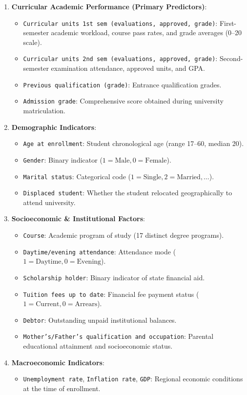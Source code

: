 \documentclass[11pt,a4paper]{article}
\begin{document}
\begin{enumerate}
    \item \textbf{Curricular Academic Performance (Primary Predictors)}:
    \begin{itemize}
        \item \texttt{Curricular units 1st sem (evaluations, approved, grade)}: First-semester academic workload, course pass rates, and grade averages (0--20 scale).
        \item \texttt{Curricular units 2nd sem (evaluations, approved, grade)}: Second-semester examination attendance, approved units, and GPA.
        \item \texttt{Previous qualification (grade)}: Entrance qualification grades.
        \item \texttt{Admission grade}: Comprehensive score obtained during university matriculation.
    \end{itemize}
    \item \textbf{Demographic Indicators}:
    \begin{itemize}
        \item \texttt{Age at enrollment}: Student chronological age (range 17--60, median 20).
        \item \texttt{Gender}: Binary indicator ($1=\text{Male}, 0=\text{Female}$).
        \item \texttt{Marital status}: Categorical code ($1=\text{Single}, 2=\text{Married}, \dots$).
        \item \texttt{Displaced student}: Whether the student relocated geographically to attend university.
    \end{itemize}
    \item \textbf{Socioeconomic \& Institutional Factors}:
    \begin{itemize}
        \item \texttt{Course}: Academic program of study (17 distinct degree programs).
        \item \texttt{Daytime/evening attendance}: Attendance mode ($1=\text{Daytime}, 0=\text{Evening}$).
        \item \texttt{Scholarship holder}: Binary indicator of state financial aid.
        \item \texttt{Tuition fees up to date}: Financial fee payment status ($1=\text{Current}, 0=\text{Arrears}$).
        \item \texttt{Debtor}: Outstanding unpaid institutional balances.
        \item \texttt{Mother's/Father's qualification and occupation}: Parental educational attainment and socioeconomic status.
    \end{itemize}
    \item \textbf{Macroeconomic Indicators}:
    \begin{itemize}
        \item \texttt{Unemployment rate}, \texttt{Inflation rate}, \texttt{GDP}: Regional economic conditions at the time of enrollment.
    \end{itemize}
\end{enumerate}
\end{document}
